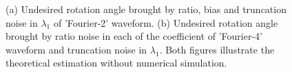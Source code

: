 \documentclass[conference, 9pt]{IEEEtran}
\begin{document}
\begin{figure}
     \centering
    \caption{(a) Undesired rotation angle brought by ratio, bias and truncation noise in $\lambda_1$ of 'Fourier-2' waveform. (b) Undesired rotation angle brought by ratio noise in each of the coefficient of 'Fourier-4' waveform and truncation noise in $\lambda_1$. Both figures illustrate the theoretical estimation without numerical simulation.}
    \label{fig:FAngle}
\end{figure}
\end{document}
